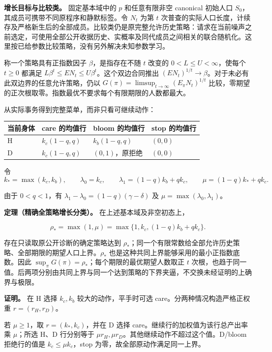 \documentclass[
  11pt,
  oneside]{book}
\newcounter{none} %
\begin{document}
\textbf{增长目标与比较类。} 固定基本域中的 \(p\) 和任意有限非空 canonical 初始人口 \(S_0\)，其成员可携带不同原程序和静默标签。令 \(N_t\) 为第 \(t\) 次普查的实际人口长度，计续存及严格新生后的全部成员。比较类仍是原完整允许历史策略：请求在当前噪声之前选定，可使用全部公开收据历史、实概率及同代成员之间相关的联合随机化。这里按已给参数比较策略，没有另外解决未知参数学习。

称一个策略具有正指数因子 \(\beta\)，是指存在不随 \(t\) 改变的 \(0<L\le U<\infty\)，使每个 \(t\ge0\) 都满足 \(L\beta^t\le E N_t\le U\beta^t\)。这个双边合同推出 \((E N_t)^{1/t}\to\beta\)。对于未必有此双边界的任意允许策略，仍以 \(G(\pi)=\limsup_{t\to\infty}(E_\pi N_t)^{1/t}\) 比较，零期望的正次根取零。指数最优不要求每个有限期限的人数都最大。

从实际事务得到完整菜单，而非只看可继续动作：

{\def\LTcaptype{none} %
\begin{longtable}[]{@{}llll@{}}
\toprule\noalign{}
当前身体 & care 的均值行 & bloom 的均值行 & stop 的均值行 \\
\midrule\noalign{}
\endhead
\bottomrule\noalign{}
\endlastfoot
H & \(k_c(1-q,q)\) & \(k_b(1-q,q)\) & \((0,0)\) \\
D & \(k_c(1-q,q)\) & \((0,1)\)，原拒绝 & \((0,0)\) \\
\end{longtable}
}

令 \[k_*=\max(k_c,k_b),\qquad
\lambda_0=k_c,\qquad \lambda_1=(1-q)k_b+qk_c,\qquad
\mu=(1-q)k_*+qk_c.\]

由于 \(0<q<1\)，有 \(\lambda_1-\lambda_0=(1-q)(\gamma-\delta)\) 及 \(\mu=\max(\lambda_0,\lambda_1)\)。

\textbf{定理（精确全策略增长分类）。} 在上述基本域及非空初态上，

\[\boxed{\rho_*=\max(1,\mu)=\max\{1,k_c,(1-q)k_b+qk_c\}.}\]

存在只读取原公开诊断的确定策略达到 \(\rho_*\)；同一个有限常数给全部允许历史策略、全部期限的期望人口上界。\(\rho_*\) 也是这种共同上界能够采用的最小正指数底数。因此 \(\sup_\pi G(\pi)=\rho_*\)；每个期限的最优期望人数取正 \(t\) 次根，也趋于同一值。后两项分别由共同上界与同一个达到策略的下界夹逼，不交换未经证明的上确界与极限。

\textbf{证明。} 在 H 选择 \(k_c,k_b\) 较大的动作，平手时可选 care。分两种情况构造严格正权重 \(r=(r_H,r_D)\)。

若 \(\mu\ge1\)，取 \(r=(k_*,k_c)\)，并在 D 选择 care。继续行的加权值为该行总产出率乘 \(\mu\)；所选 H、D 行分别等于 \(\mu r_H,\mu r_D\)。其他继续动作不超过这个值。D/bloom 拒绝行的值是 \(k_c\le\mu k_c\)，stop 为零，故全部原动作满足同一上界。
\end{document}

